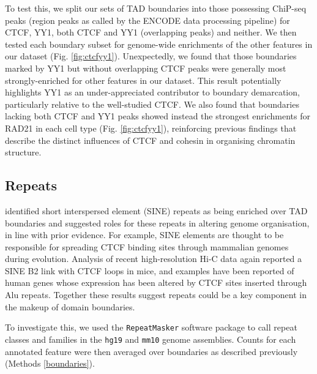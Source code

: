 \documentclass[a4paper,11pt,oneside]{book}
\begin{document}
To test this, we split our sets of TAD boundaries into those possessing
ChiP-seq peaks (region peaks as called by the ENCODE data processing pipeline\cite{Dunham2012}) for
CTCF, YY1, both CTCF and YY1 (overlapping peaks) and neither. We then
tested each boundary subset for genome-wide enrichments of the other
features in our dataset (Fig. \ref{fig:ctcfyy1}). Unexpectedly, we found that those
boundaries marked by YY1 but without overlapping CTCF peaks were
generally most strongly-enriched for other features in our dataset. This result potentially highlights YY1 as an under-appreciated contributor to boundary demarcation, particularly relative to the well-studied CTCF. We
also found that boundaries lacking both CTCF and YY1 peaks showed
instead the strongest enrichments for RAD21 in each cell type (Fig. \ref{fig:ctcfyy1}), reinforcing previous findings that describe the distinct
influences of CTCF and cohesin in organising chromatin structure.\cite{Zuin2013, Seitan2013, Phillips-Cremins2013}


\subsection{Repeats}\label{sec:repeats}

\citet{Dixon2012} identified short interspersed element (SINE) repeats as being enriched over TAD boundaries and suggested roles for these repeats in altering genome organisation, in line with prior evidence.\cite{Dixon2012, Lunyak2007} For example, SINE elements are thought to be responsible for spreading CTCF binding sites through mammalian genomes during evolution.\cite{Schmidt2012}  Analysis of recent high-resolution Hi-C data again reported a SINE B2 link with CTCF loops in mice,\cite{Rao2014} and examples have been reported of human genes whose expression has been altered by CTCF sites inserted through Alu repeats.\cite{Ruiz-Narvaez2008} Together these results suggest repeats could be a key component in the makeup of domain boundaries.

To investigate this, we used the \texttt{RepeatMasker}\cite{Tarailo-Graovac2009} software package to call repeat classes and families in the \texttt{hg19} and \texttt{mm10} genome assemblies. Counts for each annotated feature were then averaged over boundaries as described previously (Methods \ref{boundaries}).
\end{document}
